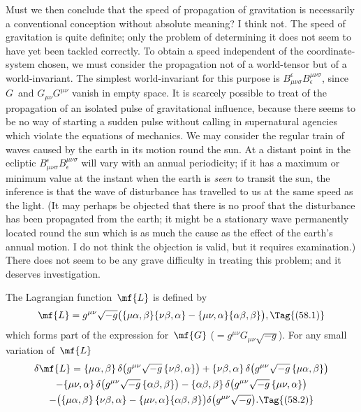 \documentclass[12pt]{book}
\begin{document}
Must we then conclude that the speed of propagation of gravitation is
necessarily a conventional conception without absolute meaning? I think not.
The speed of gravitation is quite definite; only the problem of determining
it does not seem to have yet been tackled correctly. To obtain a speed independent
of the coordinate-system chosen, we must consider the propagation
not of a world-tensor but of a world-invariant. The simplest world-invariant
for this purpose is $B_{\mu\nu\sigma}^{\epsilon} B_{\epsilon}^{\mu\nu\sigma}$, since $G$~and $G_{\mu\nu}G^{\mu\nu}$ vanish in empty space. It is
scarcely possible to treat of the propagation of an isolated pulse of gravitational
influence, because there seems to be no way of starting a sudden pulse
without calling in supernatural agencies which violate the equations of
mechanics. We may consider the regular train of waves caused by the earth
in its motion round the sun. At a distant point in the ecliptic $B_{\mu\nu\sigma}^{\epsilon} B_{\epsilon}^{\mu\nu\sigma}$ will
vary with an annual periodicity; if it has a maximum or minimum value at
the instant when the earth is \emph{seen} to transit the sun, the inference is that the
wave of disturbance has travelled to us at the same speed as the light. (It
may perhaps be objected that there is no proof that the disturbance has been
propagated from the earth; it might be a stationary wave permanently
located round the sun which is as much the cause as the effect of the earth's
annual motion. I do not think the objection is valid, but it requires examination.)
There does not seem to be any grave difficulty in treating this problem;
and it deserves investigation.


The Lagrangian function~$\mf{L}$ is defined by
%
\[
\mf{L} = g^{\mu\nu} \sqrt{-g}
\bigl(\{\mu\alpha, \beta\}\{\nu\beta, \alpha\}
    - \{\mu\nu, \alpha\} \{\alpha\beta, \beta\}\bigr),
\Tag{(58.1)}
\]
which forms part of the expression for~$\mf{G}$ ($= g^{\mu\nu} G_{\mu\nu} \sqrt{-g}$). For any small
variation of~$\mf{L}$
\begin{multline*}
  \delta\mf{L}
  = \{\mu\alpha, \beta\}\, \delta\bigl(g^{\mu\nu} \sqrt{-g}\, \{\nu\beta, \alpha\}\bigr)
  + \{\nu\beta, \alpha\}\, \delta\bigl(g^{\mu\nu} \sqrt{-g}\, \{\mu\alpha, \beta\}\bigr) \\
  - \{\mu\nu, \alpha\}\, \delta\bigl(g^{\mu\nu} \sqrt{-g}\, \{\alpha\beta, \beta\}\bigr)
  - \{\alpha\beta, \beta\}\, \delta\bigl(g^{\mu\nu} \sqrt{-g}\, \{\mu\nu, \alpha\}\bigr) \\
  - \bigl(\{\mu\alpha, \beta\}\, \{\nu\beta, \alpha\} - \{\mu\nu, \alpha\}\{\alpha\beta, \beta\}\bigr)
  \delta\bigl(g^{\mu\nu} \sqrt{-g}\bigr).
  \Tag{(58.2)}
\end{multline*}
\end{document}

